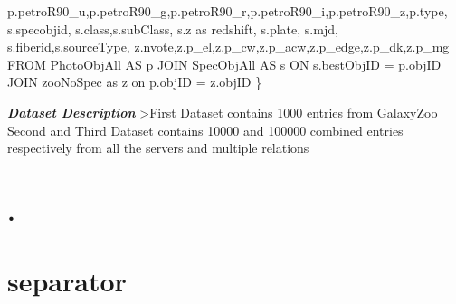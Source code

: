 \documentclass[11pt]{article}
\newenvironment{Shaded}{}{}
\newcommand{\NormalTok}[1]{{#1}}
\newcommand{\VariableTok}[1]{\textcolor[rgb]{0.10,0.09,0.49}{{#1}}}
\newcommand{\OperatorTok}[1]{\textcolor[rgb]{0.40,0.40,0.40}{{#1}}}
\newcommand{\AttributeTok}[1]{\textcolor[rgb]{0.49,0.56,0.16}{{#1}}}
\begin{document}
\begin{Shaded}
\begin{Highlighting}[]
 \VariableTok{p}\NormalTok{.}\AttributeTok{petroR90_u}\OperatorTok{,}\VariableTok{p}\NormalTok{.}\AttributeTok{petroR90_g}\OperatorTok{,}\VariableTok{p}\NormalTok{.}\AttributeTok{petroR90_r}\OperatorTok{,}\VariableTok{p}\NormalTok{.}\AttributeTok{petroR90_i}\OperatorTok{,}\VariableTok{p}\NormalTok{.}\AttributeTok{petroR90_z}\OperatorTok{,}\VariableTok{p}\NormalTok{.}\AttributeTok{type}\OperatorTok{,}
 \VariableTok{s}\NormalTok{.}\AttributeTok{specobjid}\OperatorTok{,} \VariableTok{s}\NormalTok{.}\AttributeTok{class}\OperatorTok{,}\VariableTok{s}\NormalTok{.}\AttributeTok{subClass}\OperatorTok{,} \VariableTok{s}\NormalTok{.}\AttributeTok{z} \AttributeTok{as} \AttributeTok{redshift}\OperatorTok{,}
 \VariableTok{s}\NormalTok{.}\AttributeTok{plate}\OperatorTok{,} \VariableTok{s}\NormalTok{.}\AttributeTok{mjd}\OperatorTok{,} \VariableTok{s}\NormalTok{.}\AttributeTok{fiberid}\OperatorTok{,}\VariableTok{s}\NormalTok{.}\AttributeTok{sourceType}\OperatorTok{,}
 \VariableTok{z}\NormalTok{.}\AttributeTok{nvote}\OperatorTok{,}\VariableTok{z}\NormalTok{.}\AttributeTok{p_el}\OperatorTok{,}\VariableTok{z}\NormalTok{.}\AttributeTok{p_cw}\OperatorTok{,}\VariableTok{z}\NormalTok{.}\AttributeTok{p_acw}\OperatorTok{,}\VariableTok{z}\NormalTok{.}\AttributeTok{p_edge}\OperatorTok{,}\VariableTok{z}\NormalTok{.}\AttributeTok{p_dk}\OperatorTok{,}\VariableTok{z}\NormalTok{.}\AttributeTok{p_mg}
\NormalTok{ FROM PhotoObjAll AS p}
\NormalTok{ JOIN SpecObjAll AS s ON }\VariableTok{s}\NormalTok{.}\AttributeTok{bestObjID} \OperatorTok{=} \VariableTok{p}\NormalTok{.}\AttributeTok{objID} \AttributeTok{JOIN} \AttributeTok{zooNoSpec} \AttributeTok{as} \AttributeTok{z} \AttributeTok{on} \VariableTok{p}\NormalTok{.}\AttributeTok{objID} \OperatorTok{=} \VariableTok{z}\NormalTok{.}\AttributeTok{objID}
\OperatorTok{\}}
\end{Highlighting}
\end{Shaded}

\textbf{\emph{Dataset Description}} \textgreater{}First Dataset contains
1000 entries from GalaxyZoo Second and Third Dataset contains 10000 and
100000 combined entries respectively from all the servers and multiple
relations

    \section{.}\label{section}

    \section{separator}\label{separator}
\end{document}
